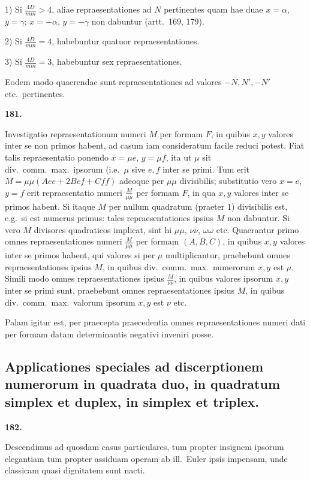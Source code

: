 \documentclass[12pt,a4paper]{article}
\theoremstyle{plain}
\theoremstyle{definition}
\theoremstyle{remark}
\begin{document}
1) Si $\frac{4D}{mm}>4$, aliae repraesentationes ad $N$ pertinentes quam hae duae $x=\alpha$, $y=\gamma$; $x=-\alpha$, $y=-\gamma$ non dabuntur (artt.\ 169, 179).

2) Si $\frac{4D}{mm}=4$, habebuntur quatuor repraesentationes.

3) Si $\frac{4D}{mm}=3$, habebuntur sex repraesentationes.

Eodem modo quaerendae sunt repraesentationes ad valores $-N,N',-N'$ etc.\ pertinentes.

\textbf{181.}

Investigatio repraesentationum numeri $M$ per formam $F$, in quibus $x,y$ valores inter se non primos habent, ad casum iam consideratum facile reduci potest. Fiat talis repraesentatio ponendo $x=\mu e$, $y=\mu f$, ita ut $\mu$ sit div.\ comm.\ max.\ ipsorum (i.e.\ $\mu$ sive $e,f$ inter se primi. Tum erit $M=\mu\mu(Aee+2Bef+Cff)$ adeoque per $\mu\mu$ divisibilis; substitutio vero $x=e$, $y=f$ erit repraesentatio numeri $\frac{M}{\mu\mu}$ per formam $F$, in qua $x,y$ valores inter se primos habent. Si itaque $M$ per nullum quadratum (praeter $1$) divisibilis est, e.g.\ si est numerus primus: tales repraesentationes ipsius $M$ non dabuntur. Si vero $M$ divisores quadraticos implicat, sint hi $\mu\mu$, $\nu\nu$, $\omega\omega$ etc. Quaerantur primo omnes repraesentationes numeri $\frac{M}{\mu\mu}$ per formam $(A,B,C)$, in quibus $x,y$ valores inter se primos habent, qui valores si per $\mu$ multiplicantur, praebebunt omnes repraesentationes ipsius $M$, in quibus div.\ comm.\ max.\ numerorum $x,y$ est $\mu$. Simili modo omnes repraesentationes ipsius $\frac{M}{\nu\nu}$, in quibus valores ipsorum $x,y$ inter se primi sunt, praebebunt omnes repraesentationes ipsius $M$, in quibus div.\ comm.\ max.\ valorum ipsorum $x,y$ est $\nu$ etc.

Palam igitur est, per praecepta praecedentia omnes repraesentationes numeri dati per formam datam determinantis negativi inveniri posse.

\subsection*{Applicationes speciales ad discerptionem numerorum in quadrata duo, in quadratum simplex et duplex, in simplex et triplex.}

\textbf{182.}

Descendimus ad quosdam casus particulares, tum propter insignem ipsorum elegantiam tum propter assiduam operam ab ill.\ Euler ipsis impensam, unde classicam quasi dignitatem sunt nacti.
\end{document}
